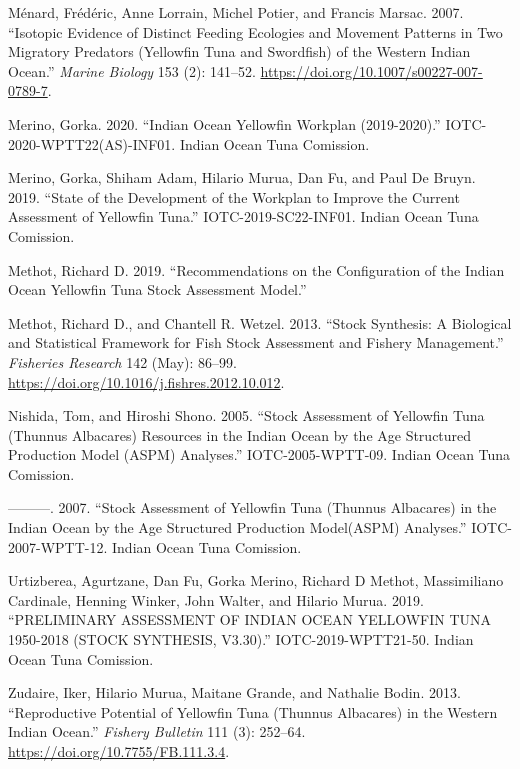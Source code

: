 \documentclass[
]{scrartcl}
\newlength{\cslhangindent}
\newenvironment{CSLReferences}[2] %
 {\begin{list}{}{%
  \setlength{\itemindent}{0pt}
  \setlength{\leftmargin}{0pt}
  \setlength{\parsep}{0pt}
  \ifodd #1
   \setlength{\leftmargin}{\cslhangindent}
   \setlength{\itemindent}{-1\cslhangindent}
  \fi
  \setlength{\itemsep}{#2\baselineskip}}}
 {\end{list}}
\begin{document}
\begin{CSLReferences}{1}{0}
Ménard, Frédéric, Anne Lorrain, Michel Potier, and Francis Marsac. 2007.
{``Isotopic Evidence of Distinct Feeding Ecologies and Movement Patterns
in Two Migratory Predators (Yellowfin Tuna and Swordfish) of the Western
{Indian Ocean}.''} \emph{Marine Biology} 153 (2): 141--52.
\url{https://doi.org/10.1007/s00227-007-0789-7}.

Merino, Gorka. 2020. {``Indian {Ocean} Yellowfin Workplan
(2019-2020).''} IOTC-2020-WPTT22(AS)-INF01. Indian Ocean Tuna Comission.

Merino, Gorka, Shiham Adam, Hilario Murua, Dan Fu, and Paul De Bruyn.
2019. {``State of the Development of the Workplan to Improve the Current
Assessment of Yellowfin Tuna.''} IOTC-2019-SC22-INF01. Indian Ocean Tuna
Comission.

Methot, Richard D. 2019. {``Recommendations on the Configuration of the
{Indian Ocean} Yellowfin Tuna Stock Assessment Model.''}

Methot, Richard D., and Chantell R. Wetzel. 2013. {``Stock Synthesis:
{A} Biological and Statistical Framework for Fish Stock Assessment and
Fishery Management.''} \emph{Fisheries Research} 142 (May): 86--99.
\url{https://doi.org/10.1016/j.fishres.2012.10.012}.

Nishida, Tom, and Hiroshi Shono. 2005. {``Stock Assessment of Yellowfin
Tuna ({Thunnus} Albacares) Resources in the {Indian Ocean} by the Age
Structured Production Model ({ASPM}) Analyses.''} IOTC-2005-WPTT-09.
Indian Ocean Tuna Comission.

---------. 2007. {``Stock Assessment of Yellowfin Tuna ({Thunnus}
Albacares) in the {Indian Ocean} by the Age Structured Production
Model({ASPM}) Analyses.''} IOTC-2007-WPTT-12. Indian Ocean Tuna
Comission.

Urtizberea, Agurtzane, Dan Fu, Gorka Merino, Richard D Methot,
Massimiliano Cardinale, Henning Winker, John Walter, and Hilario Murua.
2019. {``{PRELIMINARY ASSESSMENT OF INDIAN OCEAN YELLOWFIN TUNA}
1950-2018 ({STOCK SYNTHESIS}, {V3}.30).''} IOTC-2019-WPTT21-50. Indian
Ocean Tuna Comission.

Zudaire, Iker, Hilario Murua, Maitane Grande, and Nathalie Bodin. 2013.
{``Reproductive Potential of {Yellowfin Tuna} ({Thunnus} Albacares) in
the Western {Indian Ocean}.''} \emph{Fishery Bulletin} 111 (3): 252--64.
\url{https://doi.org/10.7755/FB.111.3.4}.

\end{CSLReferences}
\end{document}
